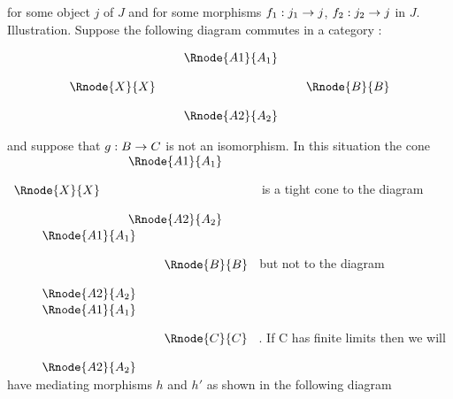 \documentclass[10pt,a4paper]{scrartcl}
\begin{document}
\noindent for some object $j$ of $J$ and for some morphisms 
$f_1:j_1 \rightarrow j$, 
$f_2:j_2 \rightarrow j$ in $J$. \\

\noindent
Illustration. Suppose the following diagram commutes in a category : 
\begin{center}
\begin{equation}
\begin{array}{cp{0.1cm}cp{0.1cm} c}
            & &\Rnode{A1}{A_1}                           \\ [0.4cm]
\Rnode{X}{X}& &                & & \Rnode{B}{B} \\ [0.4cm]
            & &\Rnode{A2}{A_2}
\end{array}
\end{equation}
\end{center}
\noindent
and suppose that $g: B \rightarrow C$ is not an isomorphism. In this situation the cone
$
\begin{array}{cp{0.1cm}cp{0.1cm} c}
            & &\Rnode{A1}{A_1}                           \\ [0.4cm]
\Rnode{X}{X}& &                & &  \\ [0.4cm]
            & &\Rnode{A2}{A_2}
\end{array}
$
is a tight cone to the diagram
$
\begin{array}{cp{0.1cm}cp{0.1cm} c}
            & &\Rnode{A1}{A_1}                           \\ [0.4cm]
            & &                & & \Rnode{B}{B} \\ [0.4cm]
            & &\Rnode{A2}{A_2}
\end{array}
$
but not to the diagram 
$
\begin{array}{cp{0.1cm}cp{0.1cm} c}
            & &\Rnode{A1}{A_1}                           \\ [0.4cm]
            & &                & & \Rnode{C}{C} \\ [0.4cm]
            & &\Rnode{A2}{A_2}
\end{array}
$
. If C has finite limits then we will have mediating morphisms $h$ and $h'$ as shown in the following diagram 
\end{document}
